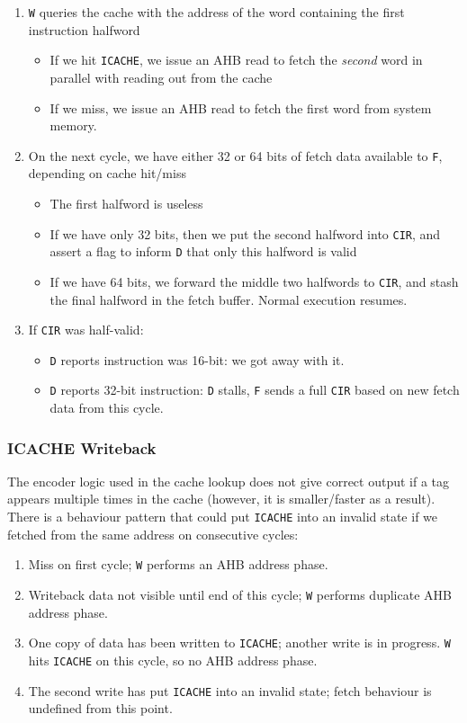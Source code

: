 \documentclass{article}
\begin{document}
\begin{enumerate}
	\item \texttt{W} queries the cache with the address of the word containing the first instruction halfword
	\begin{itemize}
		\item If we hit \texttt{ICACHE}, we issue an AHB read to fetch the \textit{second} word in parallel with reading out from the cache
		\item If we miss, we issue an AHB read to fetch the first word from system memory.
	\end{itemize}
	\item On the next cycle, we have either 32 or 64 bits of fetch data available to \texttt{F}, depending on cache hit/miss
	\begin{itemize}
		\item The first halfword is useless
		\item If we have only 32 bits, then we put the second halfword into \texttt{CIR}, and assert a flag to inform \texttt{D} that only this halfword is valid
		\item If we have 64 bits, we forward the middle two halfwords to \texttt{CIR}, and stash the final halfword in the fetch buffer. Normal execution resumes.
	\end{itemize}
	\item If \texttt{CIR} was half-valid:
		\begin{itemize}
			\item \texttt{D} reports instruction was 16-bit: we got away with it.
			\item \texttt{D} reports 32-bit instruction: \texttt{D} stalls, \texttt{F} sends a full \texttt{CIR} based on new fetch data from this cycle.
		\end{itemize}
\end{enumerate}

\subsubsection{ICACHE Writeback}

The encoder logic used in the cache lookup does not give correct output if a tag appears multiple times in the cache (however, it is smaller/faster as a result). There is a behaviour pattern that could put \texttt{ICACHE} into an invalid state if we fetched from the same address on consecutive cycles:

\begin{enumerate}
	\item Miss on first cycle; \texttt{W} performs an AHB address phase.
	\item Writeback data not visible until end of this cycle; \texttt{W} performs duplicate AHB address phase.
	\item One copy of data has been written to \texttt{ICACHE}; another write is in progress. \texttt{W} hits \texttt{ICACHE} on this cycle, so no AHB address phase.
	\item The second write has put \texttt{ICACHE} into an invalid state; fetch behaviour is undefined from this point.
\end{enumerate}
\end{document}
